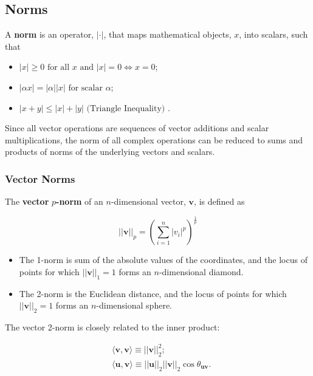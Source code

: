 \documentclass[12pt, twoside, draft]{article}
\begin{document}
\subsection{Norms}\label{sec:norms}
A \textbf{norm} is an operator, $| \cdot |$, that maps mathematical objects, $x$, into scalars, such that
\begin{itemize}[noitemsep]
\item $|x| \geq 0 \text{ for all } x \text{ and } |x| = 0 \Leftrightarrow x = 0$;
\item $|\alpha x| = |\alpha| |x| \text{ for scalar } \alpha$;
\item $|x + y| \leq |x| + |y| \text{ (Triangle Inequality) }$.
\end{itemize}

Since all vector operations are sequences of vector additions and scalar multiplications, the norm of all complex operations can be reduced to sums and products of norms of the underlying vectors and scalars.

\subsubsection{Vector Norms}\label{sec:vector-norms}
The \textbf{vector} $p$\textbf{-norm} of an $n$-dimensional vector, $\mathbf{v}$, is defined as

\begin{equation}\label{eq:vector_pnorm}
|| \mathbf{v} ||_p = \left( \sum_{i=1}^n |v_i|^p \right)^{\frac{1}{p}}
\end{equation}

\begin{itemize}[noitemsep]
\item The 1-norm is sum of the absolute values of the coordinates, and the locus of points for which $||\mathbf{v}||_1 = 1$ forms an $n$-dimensional diamond.
\item The 2-norm is the Euclidean distance, and the locus of points for which $||\mathbf{v}||_2 = 1$ forms an $n$-dimensional sphere.
\end{itemize}

The vector 2-norm is closely related to the inner product:

\begin{align}\label{eq:vector_2norm}
&\langle \mathbf{v}, \mathbf{v} \rangle \equiv || \mathbf{v} ||^2_2; \\
\label{eq:inner_product_2norm}
&\langle \mathbf{u}, \mathbf{v} \rangle \equiv ||\mathbf{u}||_2 ||\mathbf{v}||_2 \cos \theta_{\mathbf{u} \mathbf{v}}.
\end{align}
\end{document}
